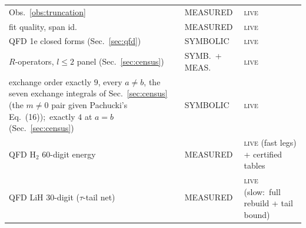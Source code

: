 \documentclass[aps,pra,twocolumn,superscriptaddress,longbibliography]{revtex4-2}
\begin{document}
\begin{table}[b]
\begin{ruledtabular}
\begin{tabular}{lll}
Obs.~\ref{obs:truncation} & MEASURED & \textsc{live} \\
fit quality, span id. & MEASURED & \textsc{live} \\
QFD 1e closed forms (Sec.~\ref{sec:qfd}) & SYMBOLIC & \textsc{live} \\
$R$-operators, $l\le2$ panel (Sec.~\ref{sec:census}) & SYMB.\ + MEAS. & \textsc{live} \\
exchange order exactly $9$, every $a\neq b$, the seven exchange integrals of Sec.~\ref{sec:census} (the $m\neq0$ pair given Pachucki's Eq.~(16));\ exactly $4$ at $a=b$ (Sec.~\ref{sec:census}) & SYMBOLIC & \textsc{live} \\
QFD H$_2$ 60-digit energy & MEASURED & \textsc{live} (fast legs) + certified tables \\
QFD LiH 30-digit ($\tau$-tail net) & MEASURED & \textsc{live} (slow:\ full rebuild + tail bound) \\
\end{tabular}
\end{ruledtabular}
\end{table}
\end{document}

